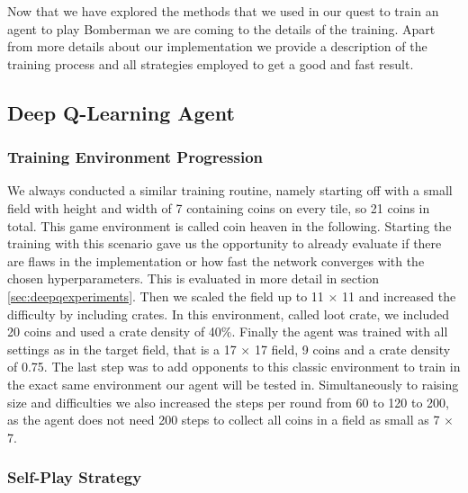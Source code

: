 
Now that we have explored the methods that we used in our quest to train an agent to play Bomberman we are coming to the details of the training. Apart from more details about our implementation we provide a description of the training process and all strategies employed to get a good and fast result.

\subsection{Deep Q-Learning Agent} \label{sec:deepqtraining}

\subsubsection{Training Environment Progression}

We always conducted a similar training routine, namely starting off with a small field with height and width of 7 containing coins on every tile, so 21 coins in total. This game environment is called coin heaven in the following. Starting the training with this scenario gave us the opportunity to already evaluate if there are flaws in the implementation or how fast the network converges with the chosen hyperparameters. This is evaluated in more detail in section \ref{sec:deepqexperiments}. Then we scaled the field up to 11 $\times$ 11 and increased the difficulty by including crates. In this environment, called loot crate, we included 20 coins and used a crate density of 40\%. Finally the agent was trained with all settings as in the target field, that is a 17 $\times$ 17 field, 9 coins and a crate density of 0.75. The last step was to add opponents to this classic environment to train in the exact same environment our agent will be tested in. Simultaneously to raising size and difficulties we also increased the steps per round from 60 to 120 to 200, as the agent does not need 200 steps to collect all coins in a field as small as 7 $\times$ 7.

\subsubsection{Self-Play Strategy}


